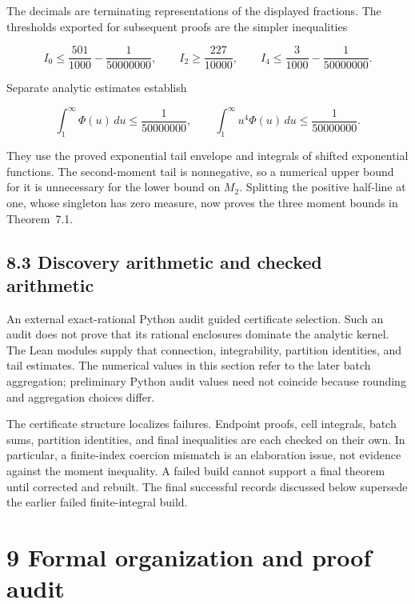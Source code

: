 \documentclass[
  11pt,
]{article}
\begin{document}
The decimals are terminating representations of the displayed fractions. The thresholds exported for subsequent proofs are the simpler inequalities

\[I_{0} \leq \frac{501}{1000} - \frac{1}{50000000},\quad\quad I_{2} \geq \frac{227}{10000},\quad\quad I_{4} \leq \frac{3}{1000} - \frac{1}{50000000}.\]

Separate analytic estimates establish

\[\int_{1}^{\infty}\Phi(u)\, du \leq \frac{1}{50000000},\quad\quad\int_{1}^{\infty}u^{4}\Phi(u)\, du \leq \frac{1}{50000000}.\]

They use the proved exponential tail envelope and integrals of shifted exponential functions. The second-moment tail is nonnegative, so a numerical upper bound for it is unnecessary for the lower bound on \(M_{2}\). Splitting the positive half-line at one, whose singleton has zero measure, now proves the three moment bounds in Theorem~7.1.

\hypertarget{discovery-arithmetic-and-checked-arithmetic}{%
\subsection{8.3 Discovery arithmetic and checked arithmetic}\label{discovery-arithmetic-and-checked-arithmetic}}

An external exact-rational Python audit guided certificate selection. Such an audit does not prove that its rational enclosures dominate the analytic kernel. The Lean modules supply that connection, integrability, partition identities, and tail estimates. The numerical values in this section refer to the later batch aggregation; preliminary Python audit values need not coincide because rounding and aggregation choices differ.

The certificate structure localizes failures. Endpoint proofs, cell integrals, batch sums, partition identities, and final inequalities are each checked on their own. In particular, a finite-index coercion mismatch is an elaboration issue, not evidence against the moment inequality. A failed build cannot support a final theorem until corrected and rebuilt. The final successful records discussed below supersede the earlier failed finite-integral build.

\hypertarget{formal-organization-and-proof-audit}{%
\section{9 Formal organization and proof audit}\label{formal-organization-and-proof-audit}}
\end{document}
